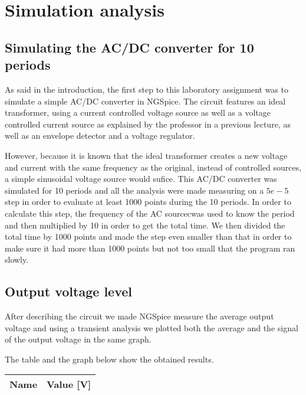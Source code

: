 \section{Simulation analysis}
\label{sec:simulation}

\subsection{Simulating the AC/DC converter for 10 periods}
As said in the introduction, the first step to this laboratory assignment was to simulate a simple AC/DC converter in NGSpice. The circuit features an ideal transformer, using a current controlled voltage source as well as a voltage controlled current source as explained by the professor in a previous lecture, as well as an envelope detector and a voltage regulator. \par
However, because it is known that the ideal transformer creates a new voltage and current with the same frequency as the original, instead of controlled sources, a simple sinusoidal voltage source would sufice.
This AC/DC converter was simulated for 10 periods and all the analysis were made measuring on a $5e-5$ step in order to evaluate at least 1000 points during the 10 periods. In order to calculate this step, the frequency of the AC sourcecwas used to know the period and then multiplied by 10 in order to get the total time. We then divided the total time by 1000 points and made the step even smaller than that in order to make sure it had more than 1000 points but not too small that the program ran slowly. \par


\subsection{Output voltage level}
After describing the circuit we made NGSpice measure the average output voltage and using a transient analysis we plotted both the average and the signal of the output voltage in the same graph. \par
The table and the graph below show the obtained results.

\begin{table}[H]
  \centering
  \begin{tabular}{|l|r|}
    \hline    
    {\bf Name} & {\bf Value [V]} \\ \hline
    
  \end{tabular}
  \label{tab:average}
\end{table}


